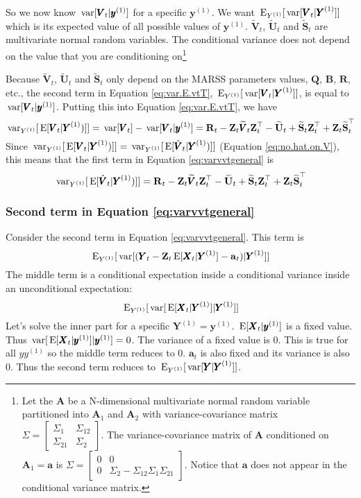 \documentclass[]{article}
\def\UPS{\mbox{\boldmath $\Upsilon$}}
\def\XI{\mbox{\boldmath $\Xi$}}
\def\AA{\mbox{$\mathbf A$}}	\def\aa{\mbox{$\mathbf a$}}
\def\BB{\mbox{$\mathbf B$}}	\def\bb{\mbox{$\mathbf b$}} \def\Bb{\mbox{$\mathbf J$}} \def\Ba{\mbox{$\mathbf L$}} \def\Bm{\UPS}
\def\E{\,\textup{\textrm{E}}}
\def\QQ{\mbox{$\mathbf Q$}}	 \def\qq{\mbox{$\mathbf q$}} \def\Qb{\mbox{$\mathbf G$}}  \def\Qm{\mathbb{Q}}
\def\RR{\mbox{$\mathbf R$}}	 \def\rr{\mbox{$\mathbf r$}} \def\Rb{\mbox{$\mathbf H$}}	\def\Rm{\mathbb{R}}
\def\Ss{\mbox{$\mathbf S$}}
\def\UU{\mbox{$\mathbf U$}}	\def\uu{\mbox{$\mathbf u$}}
\def\VV{\mbox{$\pmb{V}$}}	\def\vv{\mbox{$\pmb{v}$}}
\def\XX{\mbox{$\pmb{X}$}}	\def\xx{\mbox{$\pmb{x}$}}
\def\YY{\mbox{$\pmb{Y}$}}	\def\yy{\mbox{$\pmb{y}$}}
\def\ZZ{\mbox{$\mathbf Z$}}	\def\zz{\mbox{$\mathbf z$}}	\def\Zb{\mbox{$\mathbf M$}} \def\Za{\mbox{$\mathbf N$}} \def\Zm{\XI}
\def\var{\,\textup{\textrm{var}}}
\def\hatVt{\widetilde{\VV}_t}
\def\hatUt{\widetilde{\UU}_t}
\def\hatSt{\widetilde{\Ss}_t}
\begin{document}
So we now know $\var[\VV_t|\yy^{(1)}]$ for a specific $\yy^{(1)}$. We want $\E_{Y^{(1)}}[\var[\VV_t|\YY^{(1)}]]$ which is its expected value of all possible values of $\yy^{(1)}$. $\hatVt$, $\hatUt$ and $\hatSt$ are multivariate normal random variables. The conditional variance does not depend on the value that you are conditioning on\footnote{Let the $\AA$ be a N-dimensional multivariate normal random variable partitioned into $\AA_1$ and $\AA_2$ with variance-covariance matrix $\Sigma = \begin{bmatrix}
\Sigma_1 & \Sigma_{12} \\
\Sigma_21 & \Sigma_{2}
\end{bmatrix}$.  The variance-covariance matrix of $\AA$ conditioned on $\AA_1=\aa$ is $\Sigma = \begin{bmatrix}
0 & 0 \\
0 & \Sigma_2 - \Sigma_{12}\Sigma_{1}\Sigma_{21}
\end{bmatrix}$. Notice that $\aa$ does not appear in the conditional variance matrix.}

Because $\hatVt$, $\hatUt$ and $\hatSt$ only depend on the MARSS parameters values, $\QQ$, $\BB$, $\RR$, etc., the second term in Equation \ref{eq:var.E.vtT}, $\E_{Y^{(1)}}[\var[\VV_t|\YY^{(1)}]]$, is equal to $\var[\VV_t|\yy^{(1)}]$. Putting this into Equation \ref{eq:var.E.vtT}, we have
\begin{equation}\label{eqn:conditionalvtfinala}
\var_{Y^{(1)}}[\E[\VV_t|\YY^{(1)})]]  = \var[\VV_t] - \var[\VV_t|\yy^{(1)}] = \RR_t - \ZZ_t \hatVt \ZZ_t^\top - \hatUt + \hatSt\ZZ_t^\top + \ZZ_t\hatSt^\top
\end{equation}
Since $\var_{Y^{(1)}}[\E[\VV_t|\YY^{(1)})]] = \var_{Y^{(1)}}[\E[\hat{\VV}_t|\YY^{(1)})]]$ (Equation \ref{eq:no.hat.on.V}), this means that the first term in Equation \ref{eq:varvvtgeneral} is
\begin{equation}\label{eqn:conditionalvtfinal}
\var_{Y^{(1)}}[\E[\hat{\VV}_t|\YY^{(1)})]]  =  \RR_t - \ZZ_t \hatVt \ZZ_t^\top - \hatUt + \hatSt\ZZ_t^\top + \ZZ_t\hatSt^\top
\end{equation}

\subsubsection{Second term in Equation \ref{eq:varvvtgeneral}}

Consider the second term in Equation \ref{eq:varvvtgeneral}.  This term is 
\begin{equation}
\E_{Y^{(1)}}[\var[(\YY_t-\ZZ_t\E[\XX_t|\YY^{(1)}]-\aa_t)|\YY^{(1)}]]
\end{equation}
The middle term is a conditional expectation inside a conditional variance inside an unconditional expectation:
\begin{equation}
\E_{Y^{(1)}}[\var[\E[\XX_t|\YY^{(1)}]|\YY^{(1)}]]
\end{equation}
Let's solve the inner part for a specific $\YY^{(1)}=\yy^{(1)}$. $\E[\XX_t|\yy^{(1)}]$ is a fixed value. Thus  $\var[\E[\XX_t|\yy^{(1)}]|\yy^{(1)}]=0$. The variance of a fixed value is 0. This is true for all $yy^{(1)}$ so the middle term reduces to 0. $\aa_t$ is also fixed and its variance is also 0. Thus the second term reduces to $\E_{Y^{(1)}}[\var[\YY|\YY^{(1)}]]$.  
\end{document}
